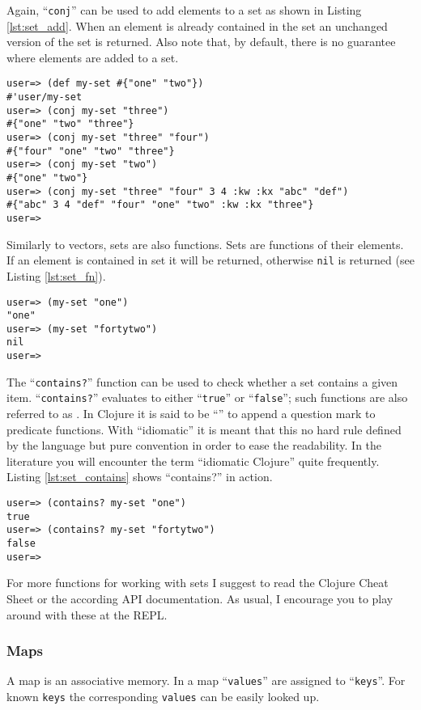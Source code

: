 Again, ``\texttt{conj}'' can be used to add elements to a set as shown in Listing \vref{lst:set_add}.
When an element is already contained in the set an unchanged version of the set is returned.
Also note that, by default, there is no guarantee where elements are added to a set.

\begin{lstlisting}[label=lst:set_add, caption=Add to a set.]
user=> (def my-set #{"one" "two"})
#'user/my-set
user=> (conj my-set "three")
#{"one" "two" "three"}
user=> (conj my-set "three" "four")
#{"four" "one" "two" "three"}
user=> (conj my-set "two")
#{"one" "two"}
user=> (conj my-set "three" "four" 3 4 :kw :kx "abc" "def")
#{"abc" 3 4 "def" "four" "one" "two" :kw :kx "three"}
user=> 
\end{lstlisting}

Similarly to vectors, sets are also functions.
Sets are functions of their elements.
If an element is contained in set it will be returned, otherwise \texttt{nil} is returned (see Listing \vref{lst:set_fn}).

\begin{lstlisting}[label=lst:set_fn, caption=Set as Function of its Elements]
user=> (my-set "one")
"one"
user=> (my-set "fortytwo")
nil
user=> 
\end{lstlisting}

The ``\texttt{contains?}'' function can be used to check whether a set contains a given item.
``\texttt{contains?}'' evaluates to either ``\texttt{true}'' or ``\texttt{false}''; such functions are also referred to as .
In Clojure it is said to be ``'' to append a question mark to predicate functions.
With ``idiomatic'' it is meant that this no hard rule defined by the language but pure convention in order to ease the readability.
In the literature you will encounter the term ``idiomatic Clojure'' quite frequently.
Listing \vref{lst:set_contains} shows ``contains?'' in action.

\begin{lstlisting}[label=lst:set_contains, caption=contains?]
user=> (contains? my-set "one")
true
user=> (contains? my-set "fortytwo")
false
user=> 
\end{lstlisting}

For more functions for working with sets I suggest to read the Clojure Cheat Sheet or the according API documentation.
As usual, I encourage you to play around with these at the REPL.

\subsubsection{Maps}
A map is an associative memory.
In a map ``\texttt{values}'' are assigned to ``\texttt{keys}''.
For known \texttt{keys} the corresponding \texttt{values} can be easily looked up.

